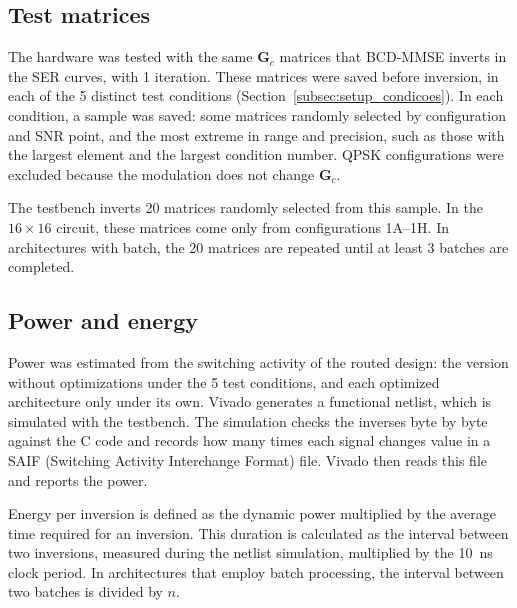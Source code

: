 \subsection{\texorpdfstring{Test matrices}{Test matrices}}\label{subsec:hw-matrizes}
The hardware was tested with the same $\mathbf{G}_c$ matrices that BCD-MMSE inverts in the SER curves, with 1 iteration. These matrices were saved before inversion, in each of the 5 distinct test conditions (Section~\ref{subsec:setup_condicoes}). In each condition, a sample was saved: some matrices randomly selected by configuration and SNR point, and the most extreme in range and precision, such as those with the largest element and the largest condition number. QPSK configurations were excluded because the modulation does not change $\mathbf{G}_c$.

The testbench inverts 20 matrices randomly selected from this sample. In the $16 \times 16$ circuit, these matrices come only from configurations 1A--1H. In architectures with batch, the 20 matrices are repeated until at least 3 batches are completed.



\subsection{\texorpdfstring{Power and energy}{Power and energy}}\label{subsec:hw-potencia}
Power was estimated from the switching activity of the routed design: the version without optimizations under the 5 test conditions, and each optimized architecture only under its own. Vivado generates a functional netlist, which is simulated with the testbench. The simulation checks the inverses byte by byte against the C code and records how many times each signal changes value in a SAIF (Switching Activity Interchange Format) file. Vivado then reads this file and reports the power.

Energy per inversion is defined as the dynamic power multiplied by the average time required for an inversion. This duration is calculated as the interval between two inversions, measured during the netlist simulation, multiplied by the 10~ns clock period. In architectures that employ batch processing, the interval between two batches is divided by $n$.
